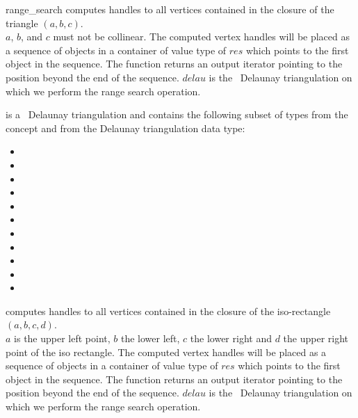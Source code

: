 \begin{ccRefFunction}{range_search}
{computes handles to all vertices contained in the closure of the triangle $(a,b,c)$.\\
\ccPrecond $a$, $b$, and $c$ must not be collinear. 
The computed vertex handles will be placed as a sequence of objects in a container of value type
of $res$
which points to the first object in the sequence. The function
returns an output iterator pointing to the position beyond the end
of the sequence. 
$delau$ is the \cgal\ Delaunay triangulation on which we perform the range search operation.}

 is a \cgal\ Delaunay triangulation and contains the following subset of types from the concept  and from
the Delaunay triangulation data type:
\begin{itemize}
  \item {} 
  \item {}
  \item {} 
  \item {}   
  \item {} 
  \item {}  
  \item {}  
  \item {} 
  \item {} 
  \item {} 
  \item {}  
\end{itemize}


{computes handles to all vertices contained in the closure of the iso-rectangle $(a,b,c,d)$.\\
\ccPrecond $a$ is the upper left point, $b$ the lower left, $c$ the lower
right and $d$ the upper right point of the iso rectangle.
The computed vertex handles will be placed as a sequence of objects in a container of value type
of $res$
which points to the first object in the sequence. The function
returns an output iterator pointing to the position beyond the end
of the sequence. $delau$ is the \cgal\ Delaunay triangulation on which we perform the range search operation.} 


\end{ccRefFunction}
